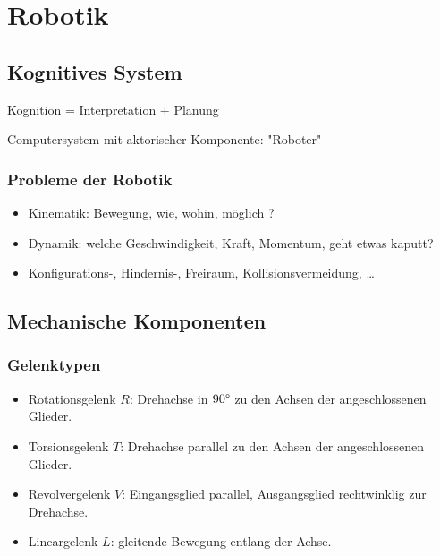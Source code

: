 
\section{Robotik}

\subsection{Kognitives System}

Kognition = Interpretation + Planung \\

Computersystem mit aktorischer Komponente: "{}Roboter"{}

\subsubsection{Probleme der Robotik}

\begin{itemize}
\item Kinematik: Bewegung, wie, wohin, möglich ?
\item Dynamik: welche Geschwindigkeit, Kraft, Momentum, geht etwas kaputt?
\item Konfigurations-, Hindernis-, Freiraum, Kollisionsvermeidung, \dots
\end{itemize}

\subsection{Mechanische Komponenten}

\subsubsection{Gelenktypen}

\begin{itemize}
\item Rotationsgelenk $R$: Drehachse in $90\degree$ zu den Achsen der angeschlossenen Glieder.
\item Torsionsgelenk $T$: Drehachse parallel zu den Achsen der angeschlossenen Glieder.
\item Revolvergelenk $V$: Eingangsglied parallel, Ausgangsglied rechtwinklig zur Drehachse.
\item Lineargelenk $L$: gleitende Bewegung entlang der Achse.
\end{itemize}

